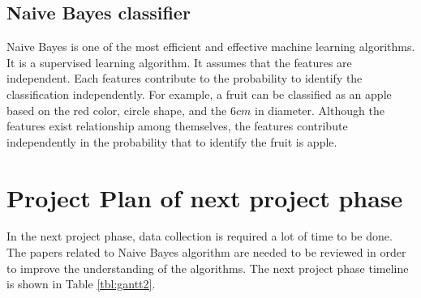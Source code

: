 \subsection{Naive Bayes classifier}
Naive Bayes is one of the most efficient and effective machine learning algorithms. It is a supervised learning algorithm. It assumes that the features are independent. Each features contribute to the probability to identify the classification independently. For example, a fruit can be classified as an apple based on the red color, circle shape, and the $6cm$ in diameter. Although the features exist relationship among themselves, the features contribute independently in the probability that to identify the fruit is apple\cite{sunil:2015}. 

\section{Project Plan of next project phase}
In the next project phase, data collection is required a lot of time to be done. The papers related to Naive Bayes algorithm are needed to be reviewed in order to improve the understanding of the algorithms. The next project phase timeline is shown in Table \ref{tbl:gantt2}.

